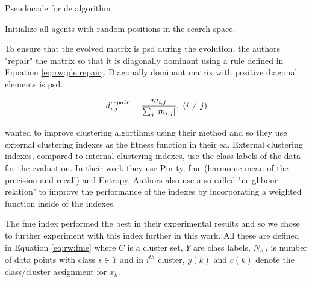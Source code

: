 \documentclass[12pt,a4paper]{report}
\begin{document}

\begin{algorithm}[t]
\caption{Pseudocode for \ac{de} algorithm} \label{pseudo:de}
\DontPrintSemicolon
\LinesNumbered
{}
Initialize all agents with random positions in the search-space.\;
\end{algorithm} 

To ensure that the evolved matrix is \ac{psd} during the evolution, the authors "repair" the matrix so that it is diagonally dominant using a rule defined in Equation \ref{eq:rw:jde:repair}. Diagonally dominant matrix with positive diagonal elements is \ac{psd}.

\begin{equation}
d_{i,j}^{repair} = \frac{m_{i,j}}{\sum_j \left|{m_{i,j}}\right|}, \; (i \neq j)
\label{eq:rw:jde:repair}
\end{equation}

\citep{fukui2013evolutionary} wanted to improve clustering algortihms using their method and so they use external clustering indexes as the fitness function in their \acl{ea}. External clustering indexes, compared to internal clustering indexes, use the class labels of the data for the evaluation. In their work they use Purity, \ac{fme} (harmonic mean of the precision and recall) and Entropy. Authors also use a so called "neighbour relation" to improve the performance of the indexes by incorporating a weighted function inside of the indexes. 

The \acl{fme} index performed the best in their experimental results and so we chose to further experiment with this index further in this work. All these are defined in Equation \ref{eq:rw:fme} where $C$ is a cluster set, $Y$ are class labels, $N_{s,i}$ is number of data points with class $s \in Y$ and in $i^{th}$ cluster, $y(k)$ and $c(k)$ denote the class/cluster assignment for $x_k$.
\end{document}
